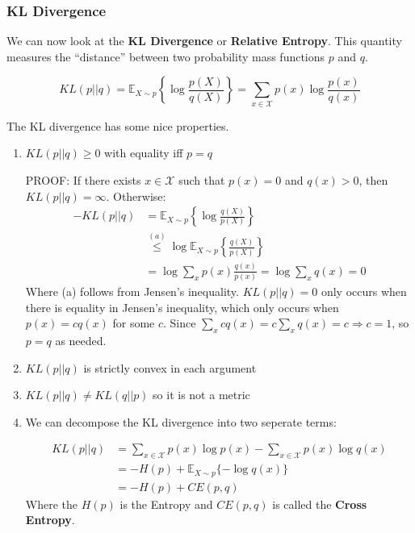 \documentclass[]{article}
\theoremstyle{mattstyle}
\theoremstyle{definition}
\begin{document}
\subsubsection{KL Divergence}
We can now look at the \textbf{KL Divergence} or \textbf{Relative Entropy}. This quantity measures the ``distance'' between two probability mass functions $p$ and $q$.

\begin{equation}
KL(p||q) = \mathbb{E}_{X\sim p}\left\{\log \frac{p(X)}{q(X)}\right\} = \sum_{x\in\mathcal{X}}p(x)\log\frac{p(x)}{q(x)}
\end{equation}

The KL divergence has some nice properties.
\begin{enumerate}
	\item $KL(p||q) \ge 0$ with equality iff $p=q$
	
	PROOF: If there exists $x \in \mathcal{X}$ such that $p(x) = 0$ and $q(x) > 0$, then $KL(p || q) = \infty$.	Otherwise:
	\begin{align*}
	-KL(p||q) &= \mathbb{E}_{X\sim p}\left\{\log \frac{q(X)}{p(X)}\right\}\\
	&\overset{(a)}{\le} \log \mathbb{E}_{X\sim p}\left\{\frac{q(X)}{p(X)}\right\} \\
	&= \log \sum_{x} p(x)\frac{q(x)}{p(x)} = \log \sum_{x} q(x) = 0
	\end{align*}
	Where (a) follows from Jensen's inequality. $KL(p||q) = 0$ only occurs when there is equality in Jensen's inequality, which only occurs when $p(x)=cq(x)$ for some $c$. Since $\sum_{x}cq(x) = c\sum_{x}q(x) = c \Rightarrow c=1$, so $p=q$ as needed.
	
	\item $KL(p||q)$ is strictly convex in each argument
	
	\item $KL(p||q) \ne KL(q||p)$ so it is not a metric
	
	\item We can decompose the KL divergence into two seperate terms:
	
	\begin{align} KL(p||q) &= \sum_{x\in\mathcal{X}}p(x)\log p(x) - \sum_{x\in\mathcal{X}}p(x)\log q(x) \\
	&= -H(p) + \mathbb{E}_{X\sim p}\{-\log q(x)\} \\
	&= -H(p) + CE(p,q)
	\end{align}
	Where the $H(p)$ is the Entropy and $CE(p,q)$ is called the \textbf{Cross Entropy}.
	
\end{enumerate}
\end{document}
